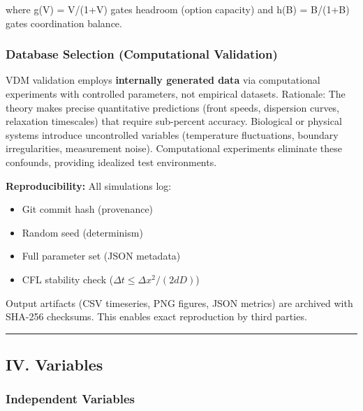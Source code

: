\documentclass[
]{article}
\providecommand{\tightlist}{%
  \setlength{\itemsep}{0pt}\setlength{\parskip}{0pt}}
\begin{document}
where g(V) = V/(1+V) gates headroom (option capacity) and h(B) = B/(1+B)
gates coordination balance.

\hypertarget{database-selection-computational-validation}{%
\subsubsection{Database Selection (Computational
Validation)}\label{database-selection-computational-validation}}

VDM validation employs \textbf{internally generated data} via
computational experiments with controlled parameters, not empirical
datasets. Rationale: The theory makes precise quantitative predictions
(front speeds, dispersion curves, relaxation timescales) that require
sub-percent accuracy. Biological or physical systems introduce
uncontrolled variables (temperature fluctuations, boundary
irregularities, measurement noise). Computational experiments eliminate
these confounds, providing idealized test environments.

\textbf{Reproducibility:} All simulations log:

\begin{itemize}
\tightlist
\item
  Git commit hash (provenance)
\item
  Random seed (determinism)
\item
  Full parameter set (JSON metadata)
\item
  CFL stability check (\(\Delta t \le \Delta x^{2}/(2 d D)\))
\end{itemize}

Output artifacts (CSV timeseries, PNG figures, JSON metrics) are
archived with SHA-256 checksums. This enables exact reproduction by
third parties.

\begin{center}\rule{0.5\linewidth}{0.5pt}\end{center}

\hypertarget{iv.-variables}{%
\subsection{IV. Variables}\label{iv.-variables}}

\hypertarget{independent-variables}{%
\subsubsection{Independent Variables}\label{independent-variables}}
\end{document}
